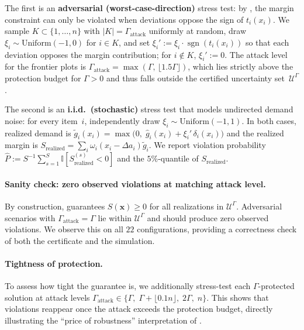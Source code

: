 \documentclass[11pt, a4paper]{article}
\theoremstyle{plain}
\theoremstyle{definition}
\theoremstyle{remark}
\newcommand{\ind}{\mathbb{I}}
\begin{document}
The first is an \textbf{adversarial (worst-case-direction)} stress test: by ,
the margin constraint can only be violated when deviations oppose the sign of $t_i(x_i)$.
We sample $K\subset\{1,\dots,n\}$ with $|K|=\Gamma_{\mathrm{attack}}$ uniformly at random,
draw $\xi_i\sim\mathrm{Uniform}(-1,0)$ for $i\in K$, and set
$\xi_i':=\xi_i\cdot\operatorname{sgn}(t_i(x_i))$ so that each deviation opposes the margin
contribution; for $i\notin K$, $\xi_i':=0$.
The attack level for the frontier plots is
$\Gamma_{\mathrm{attack}}=\max(\Gamma,\,\lfloor1.5\Gamma\rfloor)$, which lies strictly
above the protection budget for $\Gamma>0$ and thus falls outside the certified uncertainty
set~$\mathcal U^\Gamma$.

The second is an \textbf{i.i.d.\ (stochastic)} stress test that models undirected demand
noise: for every item~$i$, independently draw $\xi_i\sim\mathrm{Uniform}(-1,1)$.
In both cases, realized demand is
$\tilde g_i(x_i)=\max\big(0,\;\hat g_i(x_i)+\xi_i'\,\delta_i(x_i)\big)$ and the realized
margin is $S_{\mathrm{realized}}=\sum_i\omega_i(x_i-\Delta a_i)\tilde g_i$.
We report violation probability
$\hat P:=S^{-1}\sum_{s=1}^S\ind[S_{\mathrm{realized}}^{(s)}<0]$ and the $5\%$-quantile of
$S_{\mathrm{realized}}$.

\paragraph{Sanity check: zero observed violations at matching attack level.}
By construction,  guarantees $S(\bm x)\ge 0$ for all realizations in
$\mathcal U^\Gamma$. Adversarial scenarios with $\Gamma_{\mathrm{attack}}=\Gamma$ lie within
$\mathcal U^\Gamma$ and should produce zero observed violations. We observe this on all $22$
configurations, providing a correctness check of both the certificate and the simulation.

\paragraph{Tightness of protection.}
To assess how tight the guarantee is, we additionally stress-test each
$\Gamma$-protected solution at attack levels
$\Gamma_{\mathrm{attack}}\in\{\Gamma,\;\Gamma+\lfloor0.1n\rfloor,\;2\Gamma,\;n\}$.
This shows that violations reappear once the attack exceeds the protection budget, directly
illustrating the ``price of robustness'' interpretation of \citet{BertsimasSim2004}.
\end{document}
